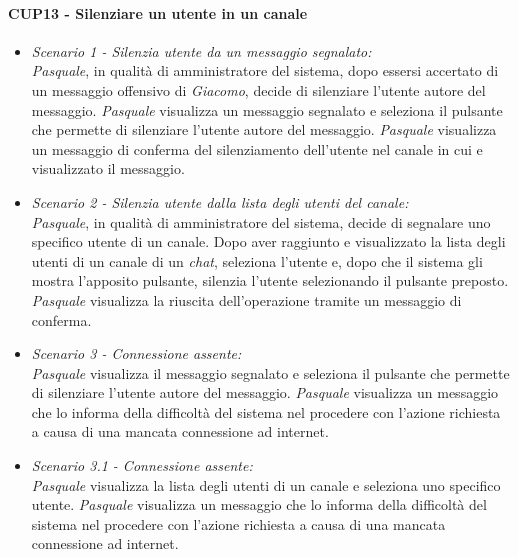 \paragraph{CUP13 - Silenziare un utente in un canale\\}
\begin{itemize}
	\item \textit{Scenario 1 - Silenzia utente da un messaggio segnalato:\\}
	\textit{Pasquale}, in qualità di amministratore del sistema, dopo essersi accertato di un messaggio offensivo di \textit{Giacomo},  decide di silenziare l’utente autore del messaggio.
	\textit{Pasquale} visualizza un messaggio segnalato e seleziona il pulsante che permette di silenziare l’utente autore del messaggio. \textit{Pasquale} visualizza un messaggio di conferma del silenziamento dell’utente nel canale in cui e visualizzato il messaggio.\\
	
	\item \textit{Scenario 2 - Silenzia utente dalla lista degli utenti del canale:\\}
	\textit{Pasquale}, in qualità di amministratore del sistema, decide di segnalare uno specifico utente di un canale. Dopo aver raggiunto e visualizzato la lista degli utenti di un canale di un \textit{chat}, seleziona l’utente e, dopo che il sistema gli mostra l’apposito pulsante, silenzia l’utente selezionando il pulsante preposto. \textit{Pasquale} visualizza la riuscita dell’operazione tramite un messaggio di conferma. \\
	
	\item \textit{Scenario 3 - Connessione assente:\\}
	\textit{Pasquale} visualizza il messaggio segnalato e seleziona il pulsante che permette di silenziare l’utente autore del messaggio. \textit{Pasquale} visualizza un messaggio che lo informa della difficoltà del sistema nel procedere con l’azione richiesta a causa di una mancata connessione ad internet.\\
	
	\item \textit{Scenario 3.1 - Connessione assente:\\}
	\textit{Pasquale} visualizza la lista degli utenti di un canale e seleziona uno specifico utente. \textit{Pasquale} visualizza un messaggio che lo informa della difficoltà del sistema nel procedere con l’azione richiesta a causa di una mancata connessione ad internet.\\
	

\end{itemize}
